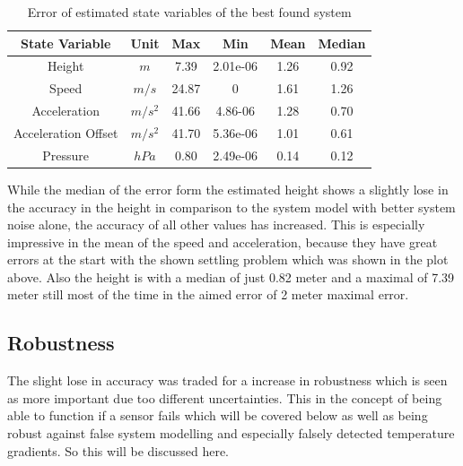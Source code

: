 \begin{table}[h!]
\centering
\begin{tabular}{cccccc}
\hline
\multicolumn{1}{|c|}{State Variable} & \multicolumn{1}{c|}{Unit} & \multicolumn{1}{c|}{Max} & \multicolumn{1}{c|}{Min} & \multicolumn{1}{c|}{Mean} & \multicolumn{1}{c|}{Median} \\ \hline
Height                            & $m$                         & 7.39	                  & 2.01e-06                 & 1.26                    & 0.92                      \\
Speed                             & $m/s$                       & 24.87                   & 0                        & 1.61                    & 1.26                      \\
Acceleration                       & $m/s^2$   			& 41.66                   & 4.86-06                  & 1.28                    & 0.70                     \\
Acceleration Offset                & $m/s^2$   			& 41.70                   & 5.36e-06                 & 1.01                    & 0.61                     \\
Pressure		          & $hPa$   			& 0.80                    & 2.49e-06                 & 0.14                    & 0.12 
\end{tabular}
\caption{Error of estimated state variables of the best found system}
\label{tab:ErrorBestPerformanceSystem}
\end{table}

While the median of the error form the estimated height shows a slightly lose in the accuracy in the height in comparison to the system model with better system noise alone,
the accuracy of all other values has increased.
This is especially impressive in the mean of the speed and acceleration, because they have great errors at the start with the shown settling problem which was shown in the plot above. 
Also the height is with a median of just 0.82 meter and a maximal of 7.39 meter still most of the time in the aimed error of 2 meter maximal error.

\subsection{Robustness}
The slight lose in accuracy was traded for a increase in robustness which is seen as more important due too different uncertainties.
This in the concept of being able to function if a sensor fails which will be covered below as well as being robust against false system modelling 
and especially falsely detected temperature gradients. So this will be discussed here.

